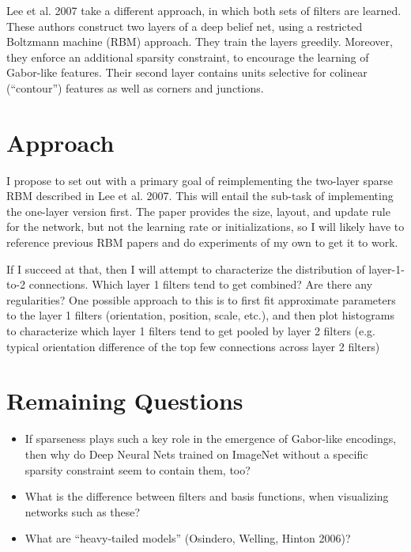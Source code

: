 \documentclass[12pt]{article}
\begin{document}
Lee et al. 2007 take a different approach, in which both sets of filters are learned. These authors construct two layers of a deep belief net, using a restricted Boltzmann machine (RBM) approach. They train the layers greedily. Moreover, they enforce an additional sparsity constraint, to encourage the learning of Gabor-like features. Their second layer contains units selective for colinear (“contour”) features as well as corners and junctions. 

\section*{Approach}

I propose to set out with a primary goal of reimplementing the two-layer sparse RBM described in Lee et al. 2007. This will entail the sub-task of implementing the one-layer version first. The paper provides the size, layout, and update rule for the network, but not the learning rate or initializations, so I will likely have to reference previous RBM papers and do experiments of my own to get it to work.

If I succeed at that, then I will attempt to characterize the distribution of layer-1-to-2 connections. Which layer 1 filters tend to get combined? Are there any regularities? One possible approach to this is to first fit approximate parameters to the layer 1 filters (orientation, position, scale, etc.), and then plot histograms to characterize which layer 1 filters tend to get pooled by layer 2 filters (e.g. typical orientation difference of the top few connections across layer 2 filters)

\section*{Remaining Questions}

\begin{itemize}
\item If sparseness plays such a key role in the emergence of Gabor-like encodings, then why do Deep Neural Nets trained on ImageNet without a specific sparsity constraint seem to contain them, too?

\item What is the difference between filters and basis functions, when visualizing networks such as these?

\item What are ``heavy-tailed models'' (Osindero, Welling, Hinton 2006)?
\end{itemize}
\end{document}
